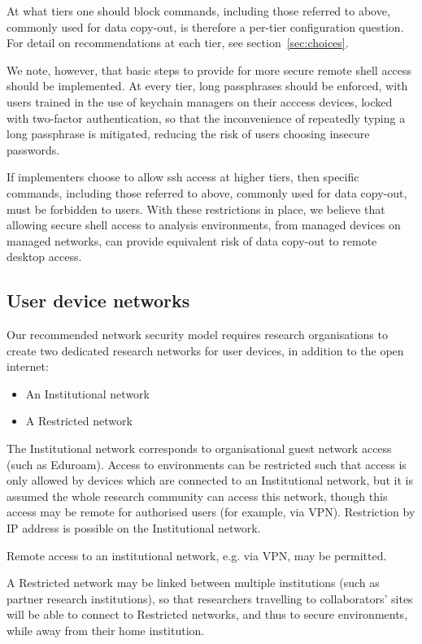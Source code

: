 \documentclass[10pt,a4paper,twocolumn]{article}
\begin{document}
At what tiers one should block commands, including those referred to above, commonly used for data copy-out, 
is therefore a per-tier configuration question. For detail on recommendations at each tier, see section~\ref{sec:choices}.

We note, however, that basic steps to provide for more secure remote shell access should be implemented. At every tier, long passphrases
should be enforced, with users trained in the use of keychain managers on their acccess devices, locked with two-factor authentication, so that the inconvenience of repeatedly
typing a long passphrase is mitigated, reducing the risk of users choosing insecure passwords.

If implementers choose to allow ssh access at higher tiers, then specific commands, including those referred to above, commonly used for data copy-out, must be forbidden to users. With these restrictions in place, we believe that allowing secure shell access to analysis environments, from managed devices on managed networks, can provide equivalent risk of data copy-out to remote desktop access. 

\subsection{User device networks}

Our recommended network security model requires research organisations to create two dedicated research networks for
user devices, in addition to the open internet:

\begin{itemize}
    \item An Institutional network
    \item A Restricted network
\end{itemize}

The Institutional network corresponds to organisational guest network access (such as Eduroam). Access to environments can be restricted such that access is only allowed by devices which are connected to an Institutional network, but it is assumed the whole research community can access this network, though this access may be remote for authorised users (for example, via VPN). Restriction
by IP address is possible on the Institutional network.

Remote access to an institutional network, e.g. via VPN, may be permitted.

A Restricted network may be linked between multiple institutions (such as partner research institutions), so that researchers travelling to collaborators' sites will be able to connect to Restricted networks, and thus to secure environments, while away from their home institution.
\end{document}

